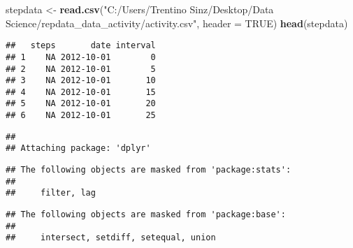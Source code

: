 \documentclass[
]{article}
\author{}
\date{\vspace{-2.5em}}
\newenvironment{Shaded}{\begin{snugshade}}{\end{snugshade}}
\newcommand{\CommentTok}[1]{\textcolor[rgb]{0.56,0.35,0.01}{\textit{#1}}}
\newcommand{\DataTypeTok}[1]{\textcolor[rgb]{0.13,0.29,0.53}{#1}}
\newcommand{\DecValTok}[1]{\textcolor[rgb]{0.00,0.00,0.81}{#1}}
\newcommand{\KeywordTok}[1]{\textcolor[rgb]{0.13,0.29,0.53}{\textbf{#1}}}
\newcommand{\NormalTok}[1]{#1}
\newcommand{\OperatorTok}[1]{\textcolor[rgb]{0.81,0.36,0.00}{\textbf{#1}}}
\newcommand{\OtherTok}[1]{\textcolor[rgb]{0.56,0.35,0.01}{#1}}
\newcommand{\StringTok}[1]{\textcolor[rgb]{0.31,0.60,0.02}{#1}}
\begin{document}
\begin{Shaded}
\begin{Highlighting}[]
\NormalTok{stepdata <-}\StringTok{ }\KeywordTok{read.csv}\NormalTok{(}\StringTok{"C:/Users/Trentino Sinz/Desktop/Data Science/repdata_data_activity/activity.csv"}\NormalTok{, }\DataTypeTok{header =} \OtherTok{TRUE}\NormalTok{)}
\KeywordTok{head}\NormalTok{(stepdata)}
\end{Highlighting}
\end{Shaded}

\begin{verbatim}
##   steps       date interval
## 1    NA 2012-10-01        0
## 2    NA 2012-10-01        5
## 3    NA 2012-10-01       10
## 4    NA 2012-10-01       15
## 5    NA 2012-10-01       20
## 6    NA 2012-10-01       25
\end{verbatim}

\begin{Shaded}
\end{Shaded}

\begin{verbatim}
## 
## Attaching package: 'dplyr'
\end{verbatim}

\begin{verbatim}
## The following objects are masked from 'package:stats':
## 
##     filter, lag
\end{verbatim}

\begin{verbatim}
## The following objects are masked from 'package:base':
## 
##     intersect, setdiff, setequal, union
\end{verbatim}

\begin{Shaded}
\end{Shaded}
\end{document}
